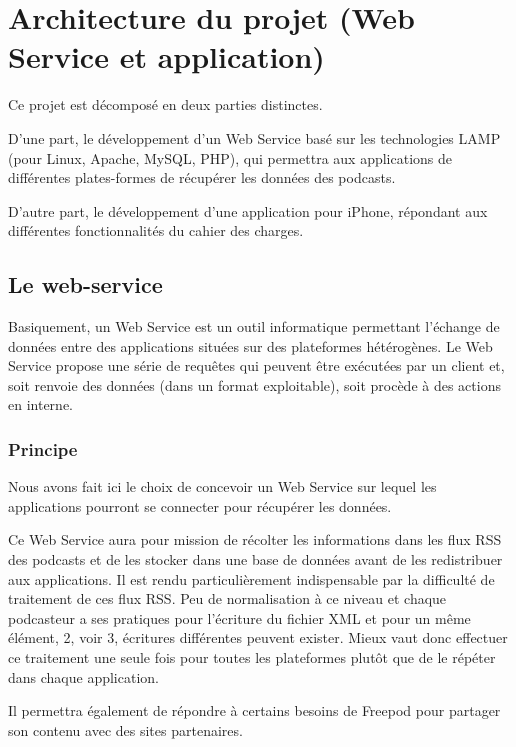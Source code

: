 \documentclass[11pt, french]{report}
\begin{document}
\section{Architecture du projet (Web Service et application)}
Ce projet est décomposé en deux parties distinctes. 

D’une part, le développement d’un Web Service basé sur les technologies LAMP (pour Linux, Apache, MySQL, PHP), qui permettra aux applications de différentes plates-formes de récupérer les données des podcasts. 

D'autre part, le développement d'une application pour iPhone, répondant aux différentes fonctionnalités du cahier des charges.

\subsection{Le web-service}

Basiquement, un Web Service est un outil informatique permettant l'échange de données entre des applications situées sur des plateformes hétérogènes. Le Web Service propose une série de requêtes qui peuvent être exécutées par un client et, soit renvoie des données (dans un format exploitable), soit procède à des actions en interne.

\subsubsection{Principe}

Nous avons fait ici le choix de concevoir un Web Service sur lequel les applications pourront se connecter pour récupérer les données. 

Ce Web Service aura pour mission de récolter les informations dans les flux RSS des podcasts et de les stocker dans une base de données avant de les redistribuer aux applications. Il est rendu particulièrement indispensable par la difficulté de traitement de ces flux RSS. Peu de normalisation à ce niveau et chaque podcasteur a ses pratiques pour l'écriture du fichier XML et pour un même élément, 2, voir 3, écritures différentes peuvent exister. Mieux vaut donc effectuer ce traitement une seule fois pour toutes les plateformes plutôt que de le répéter dans chaque application.

Il permettra également de répondre à certains besoins de Freepod pour partager son contenu avec des sites partenaires.
\end{document}
